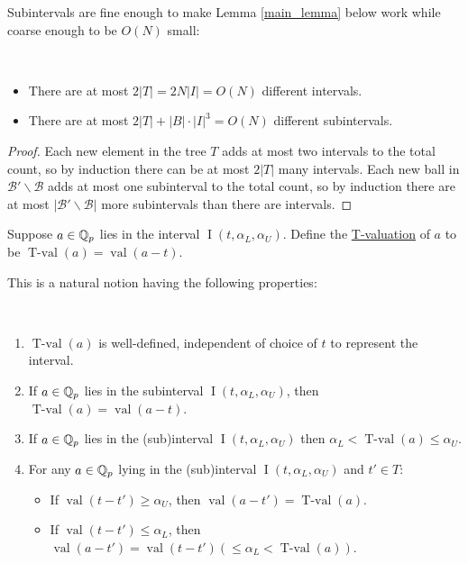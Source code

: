 \documentclass{amsart}
\newcommand{\BB}{\mathscr B}
\newcommand{\paren}[1]{\left(#1\right)}
\DeclareMathOperator{\vval}{val}
\DeclareMathOperator{\tval}{T-val}
\DeclareMathOperator{\inti}{I}
\newcommand{\defn}{\ul}
\newcommand{\interval}{\inti(t, \alpha_L, \alpha_U)}
\begin{document}
  

Subintervals are fine enough to make Lemma \ref{main_lemma} below work while coarse enough to be $O(N)$ small:
\begin{Lemma} \label{interval_count}\ 
  \begin{itemize}
  \item 
    There are at most $2|T| = 2 N |I| = O(N)$ different intervals.
  \item 
    There are at most $2|T| + |B| \cdot |I|^3 = O(N)$ different subintervals.
  \end{itemize}
\end{Lemma}

\begin{proof}
  Each new element in the tree $T$ adds at most two intervals to the total count,
  so by induction there can be at most $2|T|$ many intervals.
  Each new ball in $\BB' \backslash \BB$ adds at most one subinterval to the total count,
  so by induction there are at most $|\BB' \backslash \BB|$ more subintervals than there are intervals.
\end{proof}


\begin{Definition}
  Suppose $a \in \mathbb{Q}_p$ lies in the interval $\interval$. 
  Define the \defn{T-valuation} of $a$ to be $\tval(a) = \vval(a - t)$.    
\end{Definition}

This is a natural notion having the following properties:
\begin{Lemma}  \label{tval} \ 
  \begin{enumerate}[label=(\alph*)]
  \item $\tval(a)$ is well-defined, independent of choice of $t$ to represent the interval.
  \item If $a \in \mathbb{Q}_p$ lies in the subinterval $\interval$,
    then $\tval(a) = \vval(a - t)$.
  \item If $a \in \mathbb{Q}_p$ lies in the (sub)interval $\interval$ 
    then $\alpha_L < \tval(a) \leq \alpha_U$.
  \item For any $a \in \mathbb{Q}_p$ lying in the (sub)interval $\interval$ and $t' \in T$:
    \begin{itemize}
    \item If $\vval(t - t') \geq \alpha_U$, then $\vval(a - t') = \tval(a)$. 
    \item If $\vval(t - t') \leq \alpha_L$, then $\vval(a - t') = \vval(t - t') \paren{\leq \alpha_L < \tval(a)}$. 
    \end{itemize}
  \end{enumerate}
\end{Lemma}
\end{document}
